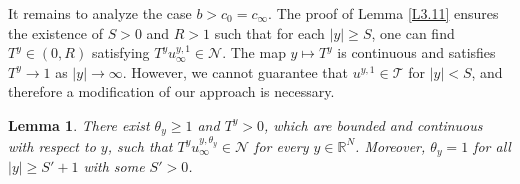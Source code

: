 \documentclass[10pt,a4paper]{amsart}
\numberwithin{equation}{section}
\newtheorem{lemma}[theorem]{Lemma}
\begin{document}
It remains to analyze the case $b > c_0 = c_\infty$. The proof of Lemma \ref{L3.11} ensures 
the existence of $S > 0$ and $R > 1$ such that for each $|y| \geq S$, one can find 
$T^y \in (0, R)$ satisfying $T^y u^{y,1}_\infty \in \mathcal{N}$. The map $y \mapsto T^y$ 
is continuous and satisfies $T^y \to 1$ as $|y| \to \infty$. However, we cannot guarantee  
that $u^{y,1}\in\mathcal{T}$ for $|y|< S$, and therefore a modification of our approach is necessary.

\begin{lemma}\label{L3.14} 
There exist $\theta_y\geq1$
and $T^y>0$, which are bounded and continuous with respect to $y$, 
such that $T^yu_\infty^{y,\theta_y}\in\mathcal{N}$ for every $y\in{\mathbb{R}^N}$. 
Moreover,  $\theta_y=1$ for all $|y|\geq S'+1$ with some $S'>0$.
\end{lemma}
\end{document}
